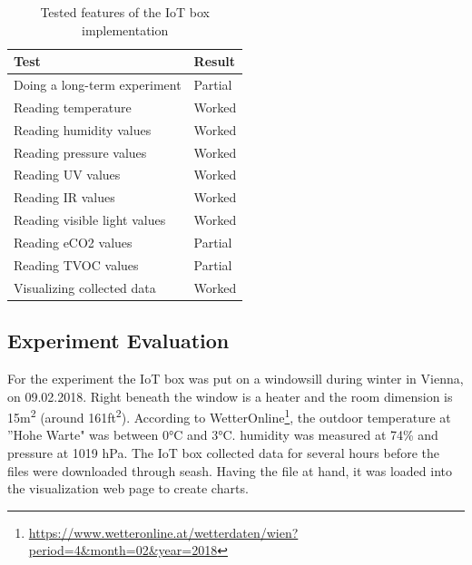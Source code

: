 \documentclass{article}      %
\begin{document}
\begin{table}[ht]
\centering
\begin{tabular}{|l|l|}
\hline
\textbf{Test} & \textbf{Result} \\ \hline
Doing a long-term experiment & Partial \\ \hline
Reading temperature & Worked \\ \hline
Reading humidity values & Worked \\ \hline
Reading pressure values & Worked \\ \hline
Reading \gls{UV} values & Worked \\ \hline
Reading \gls{IR} values & Worked \\ \hline
Reading visible light values & Worked \\ \hline
Reading \gls{eCO2} values & Partial \\ \hline
Reading \gls{TVOC} values & Partial \\ \hline
Visualizing collected data & Worked \\ \hline
\end{tabular}
\caption{Tested features of the \gls{IoT} box implementation}
\label{tab:funcTest}
\end{table}

\newpage

\subsection{Experiment Evaluation}

For the experiment the \gls{IoT} box was put on a windowsill during winter in Vienna, on 09.02.2018. Right beneath the window is a heater and the room dimension is 15m\textsuperscript{2} (around 161ft\textsuperscript{2}). According to WetterOnline\footnote{\url{https://www.wetteronline.at/wetterdaten/wien?period=4&month=02&year=2018}}, the outdoor temperature at ''Hohe Warte" was between 0°\gls{C} and 3°\gls{C}. humidity was measured at 74\% and pressure at 1019 \gls{hPa}. The \gls{IoT} box collected data for several hours before the files were downloaded through \gls{seash}. Having the file at hand, it was loaded into the visualization web page to create charts.
\newpage
\end{document}
